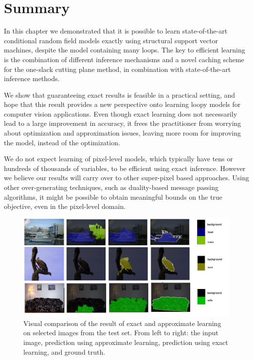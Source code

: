 \section{Summary}
In this chapter we demonstrated that it is possible to learn state-of-the-art
conditional random field models exactly using structural support vector
machines, despite the model containing many loops.  The key to efficient
learning is the combination of different inference mechanisms and a novel
caching scheme for the one-slack cutting plane method, in combination with
state-of-the-art inference methods.

We show that guaranteeing exact results is feasible in a practical setting, and
hope that this result provides a new perspective onto learning loopy models for
computer vision applications.
%
Even though exact learning does not necessarily lead to a large improvement in
accuracy, it frees the practitioner from worrying about optimization and
approximation issues, leaving more room for improving the model, instead of the
optimization.

We do not expect learning of pixel-level models, which typically have tens or
hundreds of thousands of variables, to be efficient using exact inference. However we
believe our results will carry over to other super-pixel based approaches.
Using other over-generating techniques, such as duality-based message passing
algorithms, it might be possible to obtain meaningful bounds on the true
objective, even in the pixel-level domain.

\begin{figure}
\centering
\includegraphics[width=\linewidth]{figure}
\caption{%
    Visual comparison of the result of exact and approximate learning on
    selected images from the test set.  From left to right: the input image,
    prediction using approximate learning, prediction using exact learning, and
    ground truth.
\label{visual}}
\end{figure}

